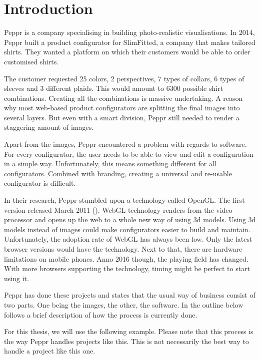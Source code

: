 \chapter{Introduction}

Peppr is a company specialising in building photo-realistic visualisations. In 2014, Peppr built a product configurator for SlimFitted, a company that makes tailored shirts. They wanted a platform on which their customers would be able to order customised shirts.

The customer requested 25 colors, 2 perspectives, 7 types of collars, 6 types of sleeves and 3 different plaids. This would amount to 6300 possible shirt combinations. Creating all the combinations is massive undertaking. A reason why most web-based product configurators are splitting the final images into several layers. But even with a smart division, Peppr still needed to render a staggering amount of images.

Apart from the images, Peppr encountered a problem with regards to software. For every configurator, the user needs to be able to view and edit a configuration in a simple way. Unfortunately, this means something different for all configurators. Combined with branding, creating a universal and re-usable configurator is difficult.

In their research, Peppr stumbled upon a technology called OpenGL. The first version released March 2011 (\cite{OpenGL Website}). WebGL technology renders from the video processor and opens up the web to a whole new way of using 3d models. Using 3d models instead of images could make configurators easier to build and maintain. Unfortunately, the adoption rate of WebGL has always been low. Only the latest browser versions would have the technology. Next to that, there are hardware limitations on mobile phones. Anno 2016 though, the playing field has changed. With more browsers supporting the technology, timing might be perfect to start using it.

Peppr has done these projects and states that the usual way of business consist of two parts. One being the images, the other, the software. In the outline below follows a brief description of how the process is currently done. 

For this thesis, we will use the following example. Please note that this process is the way Peppr handles projects like this. This is not necessarily the best way to handle a project like this one.
\newline
{}

